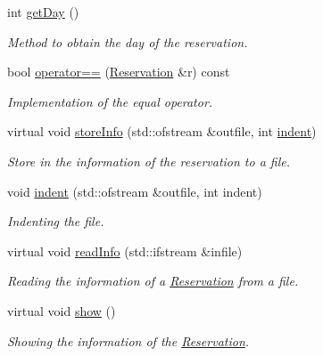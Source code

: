 \begin{DoxyCompactItemize}
int \mbox{\hyperlink{class_reservation_a22d66f6cc7532b775d5a05338ad6b196}{get\+Day}} ()
\begin{DoxyCompactList}\small\item\em Method to obtain the day of the reservation. \end{DoxyCompactList}\item 
bool \mbox{\hyperlink{class_reservation_ae033fc48c694b375e0cc68215f7dcfdb}{operator==}} (\mbox{\hyperlink{class_reservation}{Reservation}} \&r) const
\begin{DoxyCompactList}\small\item\em Implementation of the equal operator. \end{DoxyCompactList}\item 
virtual void \mbox{\hyperlink{class_reservation_a8ec83fe2eb15294c3a51a9998ed17df7}{store\+Info}} (std\+::ofstream \&outfile, int \mbox{\hyperlink{class_reservation_a480981ed050bae19bc74bbb0bbb459f9}{indent}})
\begin{DoxyCompactList}\small\item\em Store in the information of the reservation to a file. \end{DoxyCompactList}\item 
void \mbox{\hyperlink{class_reservation_a480981ed050bae19bc74bbb0bbb459f9}{indent}} (std\+::ofstream \&outfile, int indent)
\begin{DoxyCompactList}\small\item\em Indenting the file. \end{DoxyCompactList}\item 
virtual void \mbox{\hyperlink{class_reservation_acff32024a350c2156af9f74522c59b7b}{read\+Info}} (std\+::ifstream \&infile)
\begin{DoxyCompactList}\small\item\em Reading the information of a \mbox{\hyperlink{class_reservation}{Reservation}} from a file. \end{DoxyCompactList}\item 
\mbox{\label{class_reservation_a16fb0d030a178a997adef3f439665723}} 
virtual void \mbox{\hyperlink{class_reservation_a16fb0d030a178a997adef3f439665723}{show}} ()
\begin{DoxyCompactList}\small\item\em Showing the information of the \mbox{\hyperlink{class_reservation}{Reservation}}. \end{DoxyCompactList}\item 

\end{DoxyCompactItemize}
